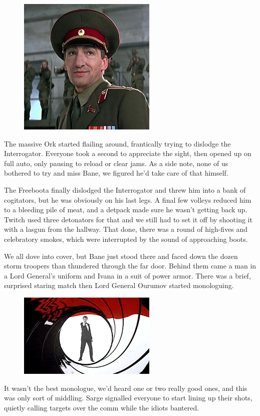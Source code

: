 \begin{figure}
	\begin{center}
		\includegraphics[width=\figwidth]{pics/9/56.png}
	\end{center}
\end{figure}
The massive Ork started flailing around, frantically trying to dislodge the Interrogator. 
Everyone took a second to appreciate the sight, then opened up on full auto, only pausing to reload or clear jams. 
As a side note, none of us bothered to try and miss Bane, we figured he'd take care of that himself.

The Freeboota finally dislodged the Interrogator and threw him into a bank of cogitators, but he was obviously on his last legs. 
A final few volleys reduced him to a bleeding pile of meat, and a detpack made sure he wasn't getting back up. 
Twitch used three detonators for that and we still had to set it off by shooting it with a lasgun from the hallway. 
That done, there was a round of high-fives and celebratory smokes, which were interrupted by the sound of approaching boots.

We all dove into cover, but Bane just stood there and faced down the dozen storm troopers than thundered through the far door. 
Behind them came a man in a Lord General's uniform and Ivana in a suit of power armor. 
There was a brief, surprised staring match then Lord General Ourumov started monologuing.

\begin{figure}
	\begin{center}
		\includegraphics[width=\figwidth]{pics/9/57.png}
	\end{center}
\end{figure}
It wasn't the best monologue, we'd heard one or two really good ones, and this was only sort of middling. 
Sarge signalled everyone to start lining up their shots, quietly calling targets over the comm while the idiots bantered.


